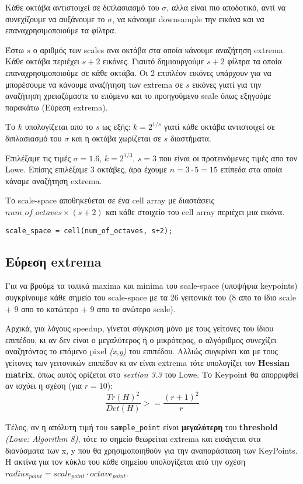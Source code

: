 \documentclass[11pt]{scrartcl} %
\begin{document}
Κάθε οκτάβα αντιστοιχεί σε διπλασιασμό του $\sigma$, αλλα είναι πιο αποδοτικό, αντί να συνεχίζουμε να αυξάνουμε το $\sigma$, να κάνουμε downsample την εικόνα και να επαναχρησιμοποιούμε τα φίλτρα.

Έστω $s$ ο αριθμός των scales ανα οκτάβα στα οποία κάνουμε αναζήτηση extrema.
Κάθε οκτάβα περιέχει $s+2$ εικόνες. Γιαυτό δημιουργούμε $s+2$ φίλτρα τα οποία επαναχρησιμοποιούμε σε κάθε οκτάβα.
Οι 2 επιπλέον εικόνες υπάρχουν για να μπορέσουμε να κάνουμε αναζήτηση των extrema σε $s$ εικόνες γιατί για την αναζήτηση χρειαζόμαστε το επόμενο και το προηγούμενο scale όπως εξηγούμε παρακάτω (Εύρεση extrema).

Το $k$ υπολογίζεται απο το $s$ ως εξής: $k = 2^{1/s}$ γιατί κάθε οκτάβα αντιστοιχεί σε διπλασιασμό του $\sigma$ και η οκτάβα χωρίζεται σε $s$ διαστήματα.

Επιλέξαμε τις τιμές $\sigma = 1.6$, $k = 2^{1/3}$, $s = 3$ που είναι οι προτεινόμενες τιμές απο τον Lowe.
Επίσης επιλέξαμε $3$ οκτάβες, άρα έχουμε $n = 3 \cdot 5 = 15$ επίπεδα στα οποία κάναμε αναζήτηση extrema.

Το scale-space αποθηκεύεται σε ένα cell array με διαστάσεις $num\_of\_octaves \times (s+2)$ και κάθε στοιχείο του cell array περιέχει μια εικόνα.
\begin{verbatim}
scale_space = cell(num_of_octaves, s+2);
\end{verbatim}

\subsection{Εύρεση extrema}

Για να βρούμε τα τοπικά maxima και minima του scale-space (υποψήφια keypoints) συγκρίνουμε κάθε σημείο του scale-space
με τα 26 γειτονικά του (8 απο το ίδιο scale + 9 απο το κατώτερο + 9 απο το ανώτερο scale).

Αρχικά, για λόγους speedup, γίνεται σύγκριση μόνο με τους γείτονες του ίδιου επιπέδου, κι αν δεν είναι ο μεγαλύτερος ή ο
μικρότερος, ο αλγόριθμος συνεχίζει αναζητόντας το επόμενο pixel \textit{(x,y)} του επιπέδου. Αλλιώς συγκρίνει και με τους
γείτονες των γειτονικών επιπέδον κι αν είναι extrema τότε υπολογίζει τον \textbf{Hessian matrix}, όπως αυτός ορίζεται στο
\textit{sextion 3.3} του Lowe. Το Keypoint θα απορριφθεί αν ισχύει η σχέση (για $r = 10$):
\[\frac{Tr(H)^2}{Det(H)} >= \frac{(r+1)^2}{r}\]

Τέλος, αν η απόλυτη τιμή του \texttt{sample\_point} είναι \textbf{μεγαλύτερη} του \textbf{threshold} \textit{(Lowe: Algorithm 8)},
τότε το σημείο θεωρείται extrema και εισάγεται στα διανύσματα των x, y που θα χρησιμοποιηθούν για την αναπαράσταση των KeyPoints.
Η ακτίνα για τον κύκλο του κάθε σημείου υπολογίζεται από την σχέση $radius_{point} = scale_{point}\cdot octave_{point}$.
\end{document}
